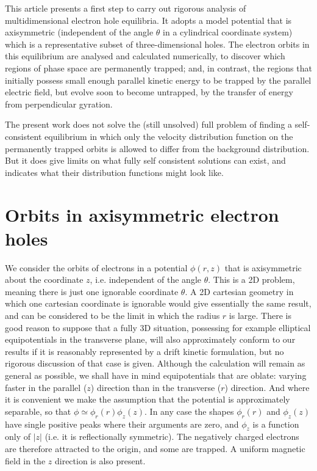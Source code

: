 \documentclass[draft,jgrga]{agutex}
\begin{document}
\begin{article}
This article presents a first step to carry out rigorous analysis of
multidimensional electron hole equilibria. It adopts a model potential
that is axisymmetric (independent of the angle $\theta$ in a
cylindrical coordinate system) which is a representative subset of
three-dimensional holes. The electron orbits in this equilibrium are
analysed and calculated numerically, to discover which regions of phase
space are permanently trapped; and, in contrast, the regions that
initially possess small enough parallel kinetic energy to be trapped
by the parallel electric field, but evolve soon to become untrapped, by
the transfer of energy from perpendicular gyration. 

The present work does not solve the (still unsolved) full problem of
finding a self-consistent equilibrium in which only the velocity
distribution function on the permanently trapped orbits is allowed to
differ from the background distribution. But it does give limits on
what fully self consistent solutions can exist, and indicates what
their distribution functions might look like.

\section{Orbits in axisymmetric electron holes}

We consider the orbits of electrons in a potential $\phi(r,z)$ that is
axisymmetric about the coordinate $z$, i.e. independent of the angle
$\theta$. This is a 2D problem, meaning there is just one ignorable
coordinate $\theta$. A 2D cartesian geometry in which one cartesian
coordinate is ignorable would give essentially the same result, and
can be considered to be the limit in which the radius $r$ is large. There
is good reason to suppose that a fully 3D situation, possessing for
example elliptical equipotentials in the transverse plane, will also
approximately conform to our results if it is reasonably represented
by a drift kinetic formulation, but no rigorous discussion of that
case is given. Although the calculation will remain as general as
possible, we shall have in mind equipotentials that are oblate:
varying faster in the parallel ($z$) direction than in the transverse
($r$) direction. And where it is convenient we make the assumption
that the potential is approximately separable, so that
$\phi\simeq \phi_r(r)\phi_z(z)$. In any case the shapes $\phi_r(r)$
and $\phi_z(z)$ have single positive peaks where their arguments are
zero, and $\phi_z$ is a function only of $|z|$ (i.e. it is
reflectionally symmetric). The negatively charged electrons are
therefore attracted to the origin, and some are trapped. A uniform
magnetic field in the $z$ direction is also present.


\end{article}
\end{document}
